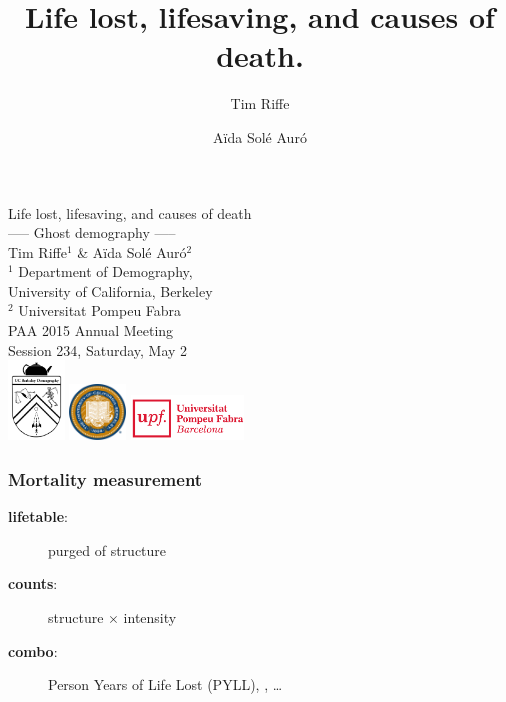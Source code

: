 \documentclass{beamer}
\title[Years Lost]{Life lost, lifesaving, and causes of death.}
\author[Riffe \& Sol\'{e}]
{
Tim Riffe \inst{1} \and A{\"i}da Sol\'{e} Aur\'{o} \inst{2}}
\institute %
{
  \inst{1}%
  Department of Demography, \\
  University of California, Berkeley \\
  \and
  \inst{2} Universitat Pompeu Fabra
}
\begin{document}

\begin{frame}[plain]

\vspace{3em}
\LARGE Life lost, lifesaving, and causes of death\\
----- Ghost demography -----\\
\vspace{3 mm}
\normalsize Tim Riffe$^1$ \& A{\"i}da Sol\'{e} Aur\'{o}$^2$\\
\vspace{3 mm}
 $^1$ Department of Demography, \\
  \hspace{2mm} University of California, Berkeley \\
  $^2$ Universitat Pompeu Fabra\\
  \vspace{5 mm}
  PAA 2015 Annual Meeting \\
  Session 234, Saturday, May 2\\
  \vspace{5 mm}
  \includegraphics[width=1.5cm]{Figures/demogcrest}\hspace{.5cm}
  \includegraphics[width=1.5cm]{Figures/ucbseal1}\hspace{3cm}
  \includegraphics[height=1.2cm]{Figures/UPFcmyk}
\end{frame}

\begin{frame}
\frametitle{Mortality measurement}
\begin{description}
\item[\textbf{lifetable}:] purged of structure
\item[\textbf{counts}:] structure $\times$ intensity
\item[\textbf{combo}:] Person Years of Life Lost (PYLL),
\underline{\hspace{1cm}},
\ldots
\end{description}

\end{frame}
\end{document}
